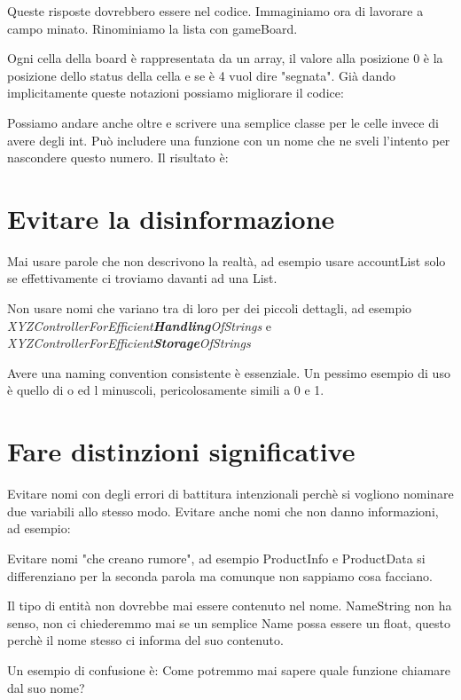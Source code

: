 \documentclass[11pt,a4paper]{book}
\begin{document}
Queste risposte dovrebbero essere nel codice. Immaginiamo ora di lavorare a campo minato. Rinominiamo la lista con gameBoard.

Ogni cella della board è rappresentata da un array, il valore alla posizione 0 è la posizione dello status della cella e se è 4 vuol dire "segnata". Già dando implicitamente queste notazioni possiamo migliorare il codice:
\label{code: 004}

Possiamo andare anche oltre e scrivere una semplice classe per le celle invece di avere degli int. Può includere una funzione con un nome che ne sveli l'intento per nascondere questo numero. Il risultato è:
\label{code: 005}

\section{Evitare la disinformazione}
Mai usare parole che non descrivono la realtà, ad esempio usare accountList solo se effettivamente ci troviamo davanti ad una List.

Non usare nomi che variano tra di loro per dei piccoli dettagli, ad esempio \emph{XYZControllerForEfficient\textbf{Handling}OfStrings} e \emph{XYZControllerForEfficient\textbf{Storage}OfStrings}

Avere una naming convention consistente è essenziale. Un pessimo esempio di uso è quello di o ed l minuscoli, pericolosamente simili a 0 e 1.

\section{Fare distinzioni significative}
Evitare nomi con degli errori di battitura intenzionali perchè si vogliono nominare due variabili allo stesso modo. Evitare anche nomi che non danno informazioni, ad esempio:
\label{code: 006}

Evitare nomi "che creano rumore", ad esempio ProductInfo e ProductData si differenziano per la seconda parola ma comunque non sappiamo cosa facciano.

Il tipo di entità non dovrebbe mai essere contenuto nel nome. NameString non ha senso, non ci chiederemmo mai se un semplice Name possa essere un float, questo perchè il nome stesso ci informa del suo contenuto.

Un esempio di confusione è:
\label{code: 007}
Come potremmo mai sapere quale funzione chiamare dal suo nome?
\end{document}
